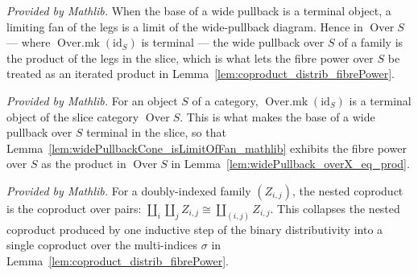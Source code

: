 \begin{lemma}
  \label{lem:widePullbackCone_isLimitOfFan_mathlib}
  \mathlibok
  \textit{Provided by Mathlib.}
  When the base of a wide pullback is a terminal object, a limiting fan of the legs is a limit of
  the wide-pullback diagram. Hence in \(\operatorname{Over} S\) --- where \(\operatorname{Over.mk}
  (\mathrm{id}_S)\) is terminal --- the wide pullback over \(S\) of a family is the product of the
  legs in the slice, which is what lets the fibre power over \(S\) be treated as an iterated
  product in Lemma~\ref{lem:coproduct_distrib_fibrePower}.
\end{lemma}

\begin{lemma}
  \label{lem:over_mkIdTerminal_mathlib}
  \mathlibok
  \textit{Provided by Mathlib.}
  For an object \(S\) of a category, \(\operatorname{Over.mk}(\mathrm{id}_S)\) is a terminal object
  of the slice category \(\operatorname{Over} S\). This is what makes the base of a wide pullback
  over \(S\) terminal in the slice, so that
  Lemma~\ref{lem:widePullbackCone_isLimitOfFan_mathlib} exhibits the fibre power over \(S\) as the
  product in \(\operatorname{Over} S\) in Lemma~\ref{lem:widePullback_overX_eq_prod}.
\end{lemma}

\begin{lemma}
  \label{lem:sigmaSigmaIso_mathlib}
  \mathlibok
  \textit{Provided by Mathlib.}
  For a doubly-indexed family \((Z_{i,j})\), the nested coproduct is the coproduct over pairs:
  \(\coprod_i \coprod_j Z_{i,j} \cong \coprod_{(i,j)} Z_{i,j}\). This collapses the nested
  coproduct produced by one inductive step of the binary distributivity into a single coproduct
  over the multi-indices \(\sigma\) in Lemma~\ref{lem:coproduct_distrib_fibrePower}.
\end{lemma}

